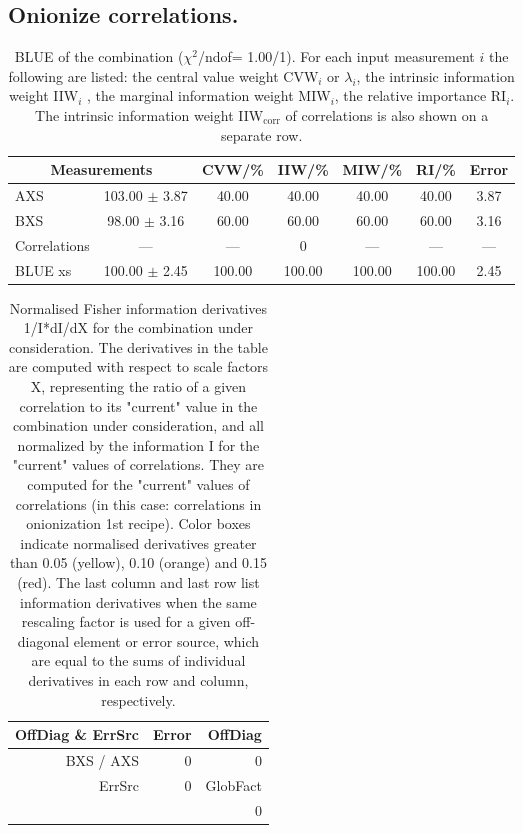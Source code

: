 \subsection{Onionize correlations.}
\begin{table}[H]
\scriptsize
\begin{center}
\renewcommand{\arraystretch}{1.1}
\begin{tabular}{|lc|c|c|c|c|c|}
\hline
\multicolumn{2}{|c|}{Measurements} & CVW/\%  & IIW/\%  & MIW/\%  & RI/\%  & {\tiny Error}\\
\hline
AXS &     103.00 $\pm$       3.87 &      40.00 &      40.00 &      40.00 &      40.00 &       3.87\\
BXS &      98.00 $\pm$       3.16 &      60.00 &      60.00 &      60.00 &      60.00 &       3.16\\
Correlations & --- & --- &  0 & --- & --- & ---\\
\hline
BLUE {\tiny xs} &     100.00 $\pm$       2.45 &     100.00 &     100.00 &     100.00 &     100.00 &       2.45\\
\hline
\end{tabular}
\caption{BLUE of the combination ($\chi^2$/ndof=      1.00/1).
 For each input measurement $i$ the following are listed: the central value weight CVW$_i$ or $\lambda_i$, the intrinsic information weight IIW$_i$ , the marginal information weight MIW$_i$, the relative importance RI$_i$. The intrinsic information weight IIW$_{\mathrm{corr}}$ of correlations is also shown on a separate row.}
\renewcommand{\arraystretch}{1}
\end{center}
\end{table}
\begin{table}[H]
\scriptsize
\begin{center}
\renewcommand{\arraystretch}{1.1}
\begin{tabular}{|r|r|r|}
\hline
 OffDiag \& ErrSrc & {\tiny Error} & OffDiag\\
\hline
BXS / AXS &  0 &  0 \\
\hline
\multirow{2}{*}{ErrSrc} & \multirow{2}{*}{ 0} & GlobFact\\
 & &  0 \\
\hline
\end{tabular}
\renewcommand{\arraystretch}{1}
\caption{Normalised Fisher information derivatives 1/I*dI/dX for the combination under consideration. The derivatives in the table are computed with respect to scale factors X, representing the ratio of a given correlation to its "current" value in the combination under consideration, and all normalized by the information I for the "current" values of correlations. They are computed for the "current" values of correlations (in this case: correlations in onionization 1st recipe). Color boxes indicate normalised derivatives greater than 0.05 (yellow), 0.10 (orange) and 0.15 (red). The last column and last row list information derivatives when the same rescaling factor is used for a given off-diagonal element or error source, which are equal to the sums of individual derivatives in each row and column, respectively.}
\end{center}
\end{table}
